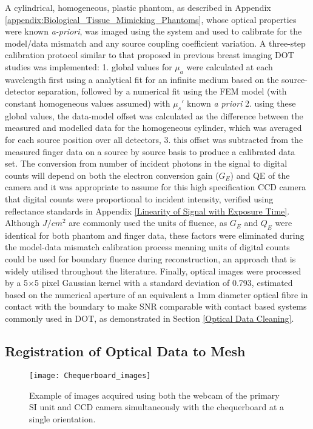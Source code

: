 \documentclass[twoside]{bhamthesis}
\theoremstyle{definition}
\begin{document}
A cylindrical, homogeneous, plastic phantom, as described in Appendix \ref{appendix:Biological_Tissue_Mimicking_Phantoms}, whose optical properties were known \textit{a-priori}, was imaged using the system and used to calibrate for the model/data mismatch and any source coupling coefficient variation. A three-step calibration protocol similar to that proposed in previous breast imaging DOT studies \cite{Dehghani2003} was implemented: 1. global values for $\mu_a$ were calculated at each wavelength first using a analytical fit for an infinite medium based on the source-detector separation, followed by a numerical fit using the FEM model (with constant homogeneous
values assumed) with $\mu_s'$ known \textit{a priori} 2. using these global values, the data-model offset was calculated as the difference between the measured and modelled data for the homogeneous cylinder, which was averaged for each source position over all detectors, 3. this offset was subtracted from the measured finger data on a source by source basis to produce a calibrated data set. The conversion from number of incident photons in the signal to digital counts will depend on both the electron conversion gain ($G_E$) and QE of the camera and it was appropriate to assume for this high specification CCD camera that digital counts were proportional to incident intensity, verified using reflectance standards in Appendix 
\ref{Linearity of Signal with Exposure Time}. Although $J/cm^2$ are commonly used the units of fluence, as $G_E$ and $Q_E$ were identical for both phantom and finger data, these factors were eliminated during the model-data mismatch calibration process meaning units of digital counts could be used for boundary fluence during reconstruction, an approach that is widely utilised throughout the literature. Finally, optical images were processed by a 5$\times$5 pixel Gaussian kernel with a standard deviation of 0.793, estimated based on the numerical aperture of an equivalent a 1mm diameter optical fibre in contact with the boundary to make SNR comparable with contact based systems commonly used in DOT, as demonstrated in Section \ref{Optical Data Cleaning}.

\subsection{Registration of Optical Data to Mesh}

\label{Registration of Optical Data to Mesh}


\begin{figure}[!ht]
\texttt{[image: Chequerboard\_images]}
\centering
\caption{Example of images acquired using both the webcam of the primary SI unit and CCD camera simultaneously with the chequerboard at a single orientation.}
\centering
\label{fig:Chequerboard_images}
\end{figure}
\end{document}
